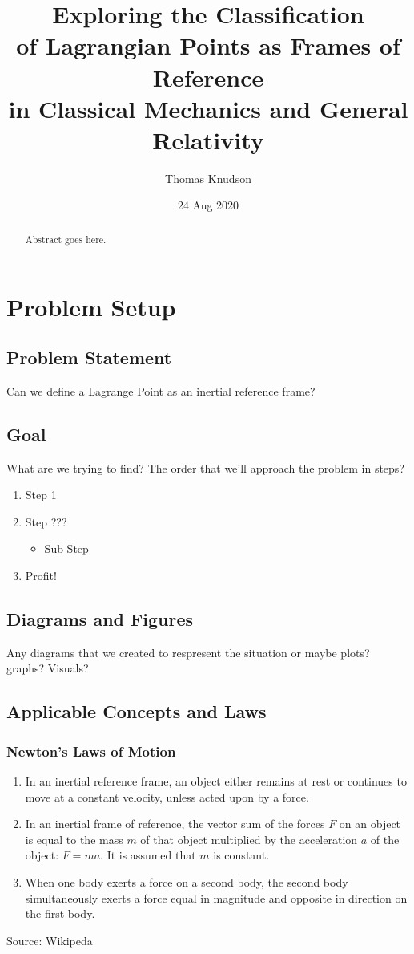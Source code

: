 \documentclass[]{report}
\title{Exploring the Classification \\of Lagrangian Points as Frames of Reference\\  \large in Classical Mechanics and General Relativity}
\author{Thomas Knudson}
\date{24 Aug 2020}
\begin{document}
  \maketitle

  \begin{abstract}
    Abstract goes here.
    \end{abstract}

  \chapter{Problem Setup}
    \section{Problem Statement}
      Can we define a Lagrange Point as an inertial reference frame?

    \section{Goal}
      What are we trying to find? The order that we'll approach the problem in steps?

      \begin{enumerate}
       \item Step 1
       \item Step ???
       \begin{itemize}
         \item Sub Step
        \end{itemize}
       \item Profit!
        \end{enumerate}

    \section{Diagrams and Figures}
      Any diagrams that we created to respresent the situation or maybe plots? graphs? Visuals?

    \section{Applicable Concepts and Laws}
      \subsection{Newton's Laws of Motion}
        \begin{enumerate}
          \item In an inertial reference frame, an object either remains at rest or continues to move at a constant velocity, unless acted upon by a force.
          \item In an inertial frame of reference, the vector sum of the forces $F$ on an object is equal to the mass $m$ of that object multiplied by the acceleration $a$ of the object: $F = ma$. It is assumed that $m$ is constant.
          \item When one body exerts a force on a second body, the second body simultaneously exerts a force equal in magnitude and opposite in direction on the first body.
          \end{enumerate}
        Source: Wikipeda
\end{document}
